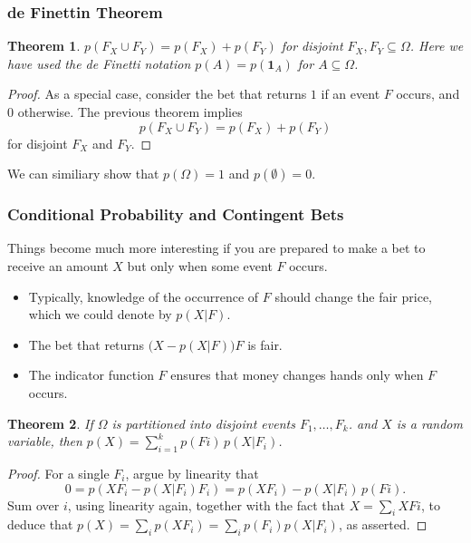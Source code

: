 \documentclass{beamer}
\newtheorem{thm}{Theorem}
\begin{document}
\begin{frame}
\frametitle{de Finettin Theorem}
\begin{thm}
 $	 p(F_X \cup F_Y) = p(F_X) + p(F_Y)$ for disjoint $F_X, F_Y \subseteq \Omega$. Here we have used the de Finetti notation $p(A) = p(\mathbf{1}_A)$ for $A \subseteq \Omega$.
\end{thm}
\pause
\begin{proof}
	As a special case, consider the bet that returns $1$ if an event $F$ occurs, and $0$	otherwise. The previous theorem  implies   $$	 p(F_X \cup F_Y) =	p(F_X) + p(F_Y)$$ for disjoint $F_X$ and $F_Y$.
\end{proof}
\pause
We can similiary show that $p(\Omega) = 1$ and $p(\emptyset) = 0$.

\end{frame}

\begin{frame}
\frametitle{Conditional Probability and Contingent Bets}
Things become much more interesting if you are prepared to make a bet to receive an amount $X$ but only when some event $F$ occurs. 
\pause

\begin{itemize}
\item Typically, knowledge of the occurrence of $F$ should change the fair price, which we could denote by $p(X | F)$. 
\pause
\item The bet that returns $\big(X - p(X | F)\big) F$ is fair. 
\pause
\item The indicator function $F$ ensures that money changes hands only when $F$ occurs.
\end{itemize}
\end{frame}

\begin{frame}
\begin{thm}
If $\Omega$ is partitioned into disjoint events $F_1, \dots, F_k$. and $X$ is a random variable, then $p(X) = \sum_{i = 1}^{k} p(Fi)\, p(X | F_i)$. 
\end{thm}
\begin{proof}
For a single $F_i$, argue by linearity that $$0 = p (X F_i - p(X | F_i)F_i) = p(XF_i) - p(X | F_i)\,p(Fi).$$
Sum over $i$, using linearity again, together with the fact that $X = \sum_i X Fi$, to deduce
that $p(X) =\sum_i p(XF_i) = \sum_i p(F_i)p(X | F_i)$, as asserted.
\end{proof}
\end{frame}
\end{document}
